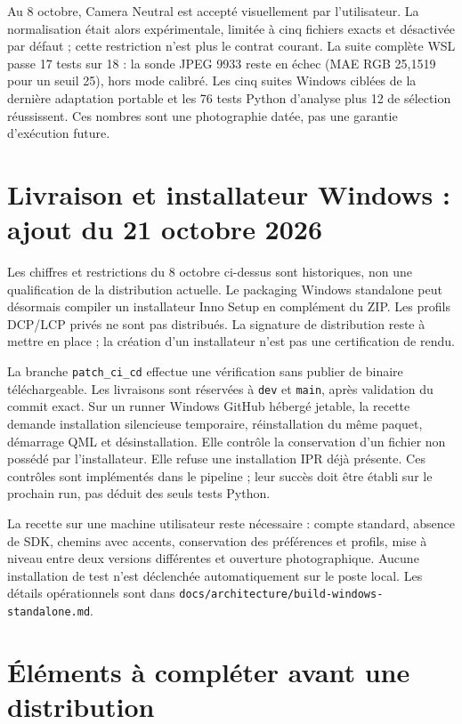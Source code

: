 Au 8 octobre, Camera Neutral est accepté visuellement par l'utilisateur.
La normalisation était alors expérimentale, limitée à cinq fichiers exacts et
désactivée par défaut ; cette restriction n'est plus le contrat courant. La suite complète WSL passe 17 tests sur 18 : la sonde
JPEG 9933 reste en échec (MAE RGB 25,1519 pour un seuil 25), hors mode calibré.
Les cinq suites Windows ciblées de la dernière adaptation portable et les
76 tests Python d'analyse plus 12 de sélection réussissent. Ces nombres sont
une photographie datée, pas une garantie d'exécution future.

\section{Livraison et installateur Windows : ajout du 21 octobre 2026}
\begingroup
{}

Les chiffres et restrictions du 8 octobre ci-dessus sont historiques, non une
qualification de la distribution actuelle. Le packaging Windows standalone peut
désormais compiler un installateur Inno Setup en complément du ZIP. Les profils
DCP/LCP privés ne sont pas distribués. La signature de distribution reste à mettre
en place ; la création d'un installateur n'est pas une certification de rendu.

La branche \texttt{patch\_ci\_cd} effectue une vérification sans publier de
binaire téléchargeable. Les livraisons sont réservées à \texttt{dev} et
\texttt{main}, après validation du commit exact. Sur un runner Windows GitHub
hébergé jetable, la recette demande installation silencieuse temporaire,
réinstallation du même paquet, démarrage QML et désinstallation. Elle contrôle
la conservation d'un fichier non possédé par l'installateur. Elle refuse une
installation IPR déjà présente. Ces contrôles sont implémentés dans le pipeline ;
leur succès doit être établi sur le prochain run, pas déduit des seuls tests Python.

La recette sur une machine utilisateur reste nécessaire : compte standard,
absence de SDK, chemins avec accents, conservation des préférences et profils,
mise à niveau entre deux versions différentes et ouverture photographique.
Aucune installation de test n'est déclenchée automatiquement sur le poste local.
Les détails opérationnels sont dans
\texttt{docs/architecture/build-windows-standalone.md}.
\endgroup

\section{Éléments à compléter avant une distribution}

